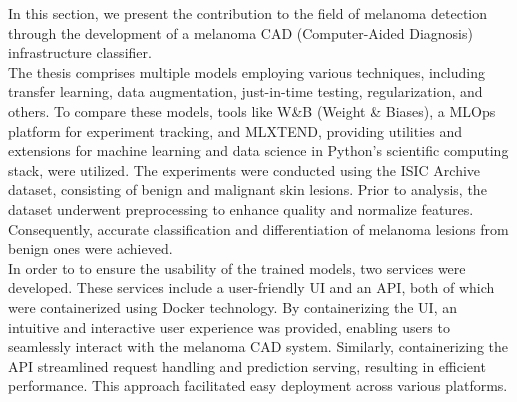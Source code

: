 In this section, we present the contribution to the field of melanoma detection through the development of a melanoma CAD (Computer-Aided Diagnosis) infrastructure classifier. \\

The thesis comprises multiple models employing various techniques, including transfer learning, data augmentation, just-in-time testing, regularization, and others. To compare these models, tools like W\&B (Weight \& Biases), a MLOps platform for experiment tracking, and MLXTEND, providing utilities and extensions for machine learning and data science in Python's scientific computing stack, were utilized. The experiments were conducted using the ISIC Archive dataset, consisting of benign and malignant skin lesions. Prior to analysis, the dataset underwent preprocessing to enhance quality and normalize features. Consequently, accurate classification and differentiation of melanoma lesions from benign ones were achieved. \\

In order to to ensure the usability of the trained models,
two services were developed. These services include a user-friendly UI and an API,
both of which were containerized using Docker technology.
By containerizing the UI, an intuitive and interactive user experience was provided, enabling users to seamlessly interact with the melanoma CAD system.
Similarly, containerizing the API streamlined request handling and prediction serving, resulting in efficient performance. This approach facilitated easy deployment across various platforms.
